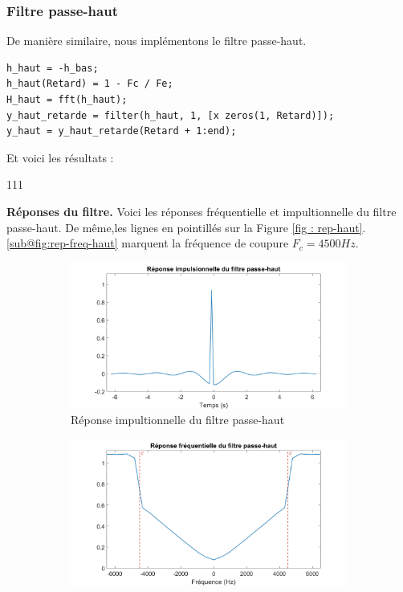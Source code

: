 \subsubsection{Filtre passe-haut}
De manière similaire, nous implémentons le filtre passe-haut.

\begin{lstlisting}[caption=Filtre passe-haut]
h_haut = -h_bas;
h_haut(Retard) = 1 - Fc / Fe;
H_haut = fft(h_haut);
y_haut_retarde = filter(h_haut, 1, [x zeros(1, Retard)]);
y_haut = y_haut_retarde(Retard + 1:end);
\end{lstlisting}
Et voici les résultats :

\begin{dinglist}{111}
   \item \textbf{Réponses du filtre.}
   Voici les réponses fréquentielle et impultionnelle du filtre passe-haut.
   De même,les lignes en pointillés sur la Figure \ref{fig : rep-haut}.\ref{sub@fig:rep-freq-haut} marquent la fréquence de coupure $F_c = 4500 Hz$.
   \begin{figure}[H]
      \centering
      \begin{subfigure}{0.5\textwidth}
         \centering
         \includegraphics[width=\textwidth]{partie-2/sous-partie-3/2.3.3.6.png}
         \caption{Réponse impultionnelle du filtre passe-haut} \label{fig:rep-imp-haut}
      \end{subfigure}%
      \begin{subfigure}{0.5\textwidth}
         \centering
         \includegraphics[width=\textwidth]{partie-2/sous-partie-3/2.3.3.7.png}

\end{subfigure}
\end{figure}
\end{dinglist}
